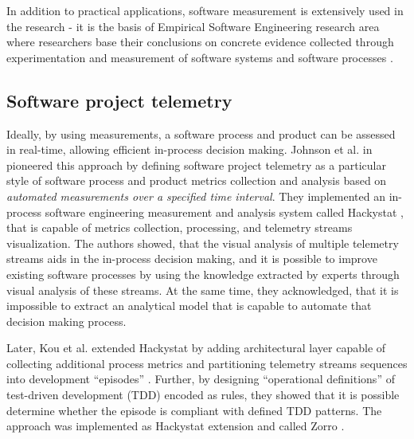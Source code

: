 In addition to practical applications, software measurement is extensively used in the research - it is the basis of 
Empirical Software Engineering research area where researchers base their conclusions on concrete evidence collected 
through experimentation and measurement of software systems and software processes \cite{citeulike:766768}.

\subsection{Software project telemetry}\label{section_software_telemetry}
Ideally, by using measurements, a software process and product can be assessed in real-time, allowing efficient 
in-process decision making.
Johnson et al. in \cite{citeulike:557296} pioneered this approach by defining software project telemetry as a 
particular style of software process and product metrics collection and analysis based on 
\textit{automated measurements over a specified time interval}. 
They implemented an in-process software engineering measurement and analysis system called Hackystat 
\cite{citeulike:12929227}, that is capable of metrics collection, processing, and telemetry streams visualization. 
The authors showed, that the visual analysis of multiple telemetry streams aids in the in-process decision making, 
and it is possible to improve existing software processes by using the knowledge extracted by experts through visual 
analysis of these streams. 
At the same time, they acknowledged, that it is impossible to extract an analytical model that is capable to 
automate that decision making process.

Later, Kou et al. extended Hackystat by adding architectural layer capable of collecting additional process metrics 
and partitioning telemetry streams sequences into development ``episodes'' \cite{citeulike:6180831}. 
Further, by designing ``operational definitions'' of test-driven development (TDD) encoded as rules,
they showed that it is possible determine whether the episode is compliant with
defined TDD patterns.
The approach was implemented as Hackystat extension and called Zorro \cite{citeulike:11538873}.

